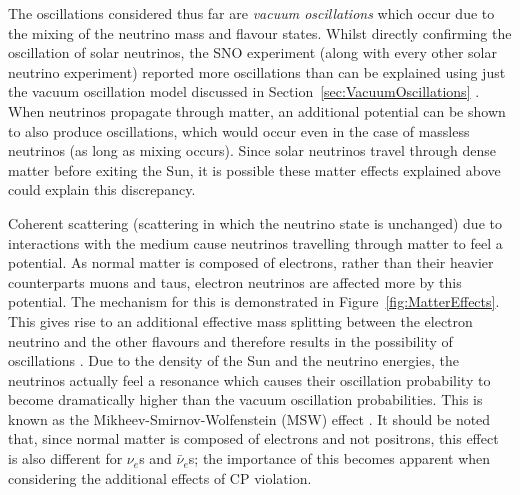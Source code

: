 The oscillations considered thus far are \textit{vacuum oscillations} which occur due to the mixing of the neutrino mass and flavour states.  Whilst directly confirming the oscillation of solar neutrinos, the SNO experiment (along with every other solar neutrino experiment) reported more oscillations than can be explained using just the vacuum oscillation model discussed in Section~\ref{sec:VacuumOscillations} \cite{Bahcall2002,Smirnov2003}.  When neutrinos propagate through matter, an additional potential can be shown to also produce oscillations, which would occur even in the case of massless neutrinos (as long as mixing occurs).  Since solar neutrinos travel through dense matter before exiting the Sun, it is possible these matter effects explained above could explain this discrepancy.

Coherent scattering (scattering in which the neutrino state is unchanged) due to interactions with the medium cause neutrinos travelling through matter to feel a potential.  As normal matter is composed of electrons, rather than their heavier counterparts muons and taus, electron neutrinos are affected more by this potential.  The mechanism for this is demonstrated in Figure~\ref{fig:MatterEffects}.  This gives rise to an additional effective mass splitting between the electron neutrino and the other flavours and therefore results in the possibility of oscillations \cite{Wolfenstein1978}.  Due to the density of the Sun and the neutrino energies, the neutrinos actually feel a resonance which causes their oscillation probability to become dramatically higher than the vacuum oscillation probabilities.  This is known as the Mikheev-Smirnov-Wolfenstein (MSW) effect \cite{MS1985,MS1986}.  It should be noted that, since normal matter is composed of electrons and not positrons, this effect is also different for $\nu_e$s and $\bar{\nu}_e$s; the importance of this becomes apparent when considering the additional effects of CP violation.

